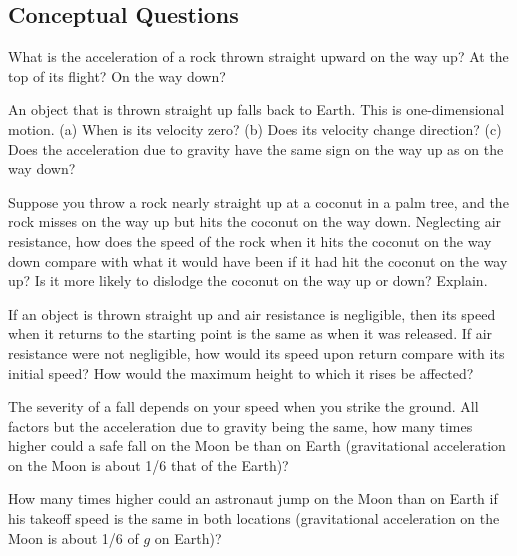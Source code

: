 \documentclass[
]{book}
\newenvironment{conceptual-questions}{}{}
\begin{document}
\hypertarget{fs-id1358164}{}
\begin{conceptual-questions}

\hypertarget{conceptual-questions-5}{%
\subsection{Conceptual Questions}\label{conceptual-questions-5}}

\hypertarget{fs-id1427339}{}
\leavevmode\hypertarget{fs-id4095246}{}%
What is the acceleration of a rock thrown straight upward on the way up?
At the top of its flight? On the way down?

\hypertarget{fs-id3606158}{}
\leavevmode\hypertarget{fs-id1713184}{}%
An object that is thrown straight up falls back to Earth. This is
one-dimensional motion. (a) When is its velocity zero? (b) Does its
velocity change direction? (c) Does the acceleration due to gravity have
the same sign on the way up as on the way down?

\hypertarget{fs-id2044867}{}
\leavevmode\hypertarget{fs-id2006404}{}%
Suppose you throw a rock nearly straight up at a coconut in a palm tree,
and the rock misses on the way up but hits the coconut on the way down.
Neglecting air resistance, how does the speed of the rock when it hits
the coconut on the way down compare with what it would have been if it
had hit the coconut on the way up? Is it more likely to dislodge the
coconut on the way up or down? Explain.

\hypertarget{fs-id1773324}{}
\leavevmode\hypertarget{fs-id2300211}{}%
If an object is thrown straight up and air resistance is negligible,
then its speed when it returns to the starting point is the same as when
it was released. If air resistance were not negligible, how would its
speed upon return compare with its initial speed? How would the maximum
height to which it rises be affected?

\hypertarget{fs-id1776230}{}
\leavevmode\hypertarget{fs-id2158441}{}%
The severity of a fall depends on your speed when you strike the ground.
All factors but the acceleration due to gravity being the same, how many
times higher could a safe fall on the Moon be than on Earth
(gravitational acceleration on the Moon is about 1/6 that of the Earth)?

\hypertarget{fs-id2271654}{}
\leavevmode\hypertarget{fs-id4018154}{}%
How many times higher could an astronaut jump on the Moon than on Earth
if his takeoff speed is the same in both locations (gravitational
acceleration on the Moon is about 1/6 of \(g{}\) on Earth)?

\end{conceptual-questions}
\end{document}
